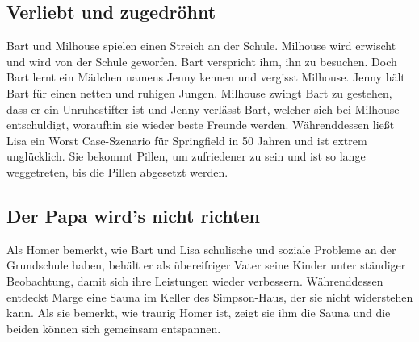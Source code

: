 \subsection{Verliebt und zugedröhnt}
Bart und Milhouse spielen einen Streich an der Schule. Milhouse wird erwischt und wird von der Schule geworfen. Bart verspricht ihm, ihn zu besuchen. Doch Bart lernt ein Mädchen namens Jenny kennen und vergisst Milhouse. Jenny hält Bart für einen netten und ruhigen Jungen. Milhouse zwingt Bart zu gestehen, dass er ein Unruhestifter ist und Jenny verlässt Bart, welcher sich bei Milhouse entschuldigt, woraufhin sie wieder beste Freunde werden. Währenddessen ließt Lisa ein \glqq Worst Case\grqq -Szenario für Springfield in 50 Jahren und ist extrem unglücklich. Sie bekommt Pillen, um zufriedener zu sein und ist so lange weggetreten, bis die Pillen abgesetzt werden. 


\subsection{Der Papa wird's nicht richten}
Als Homer bemerkt, wie Bart und Lisa schulische und soziale Probleme an der Grundschule haben, behält er als übereifriger Vater seine Kinder unter ständiger Beobachtung, damit sich ihre Leistungen wieder verbessern. Währenddessen entdeckt Marge eine Sauna im Keller des Simpson-Haus, der sie nicht widerstehen kann.  Als sie bemerkt, wie traurig Homer ist, zeigt sie ihm die Sauna und die beiden können sich gemeinsam entspannen. 



